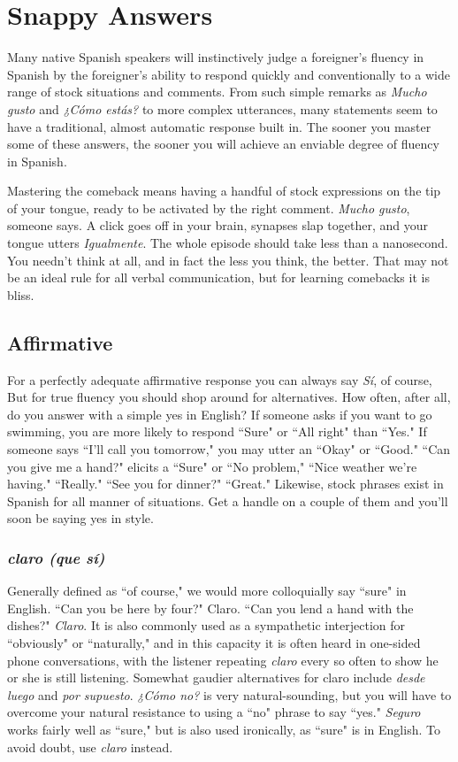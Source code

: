 \chapter{Snappy Answers}

Many native Spanish speakers will instinctively judge a foreigner's fluency in Spanish by the foreigner's ability to respond quickly
and conventionally to a wide range of stock situations and comments.
From such simple remarks as \emph{Mucho gusto} and \emph{¿Cómo estás?} to more
complex utterances, many statements seem to have a traditional, almost automatic response built in. The sooner you master some of
these answers, the sooner you will achieve an enviable degree of fluency in Spanish.

Mastering the comeback means having a handful of stock expressions on the tip of your tongue, ready to be activated by the right
comment. \emph{Mucho gusto}, someone says. A click goes off in your brain,
synapses slap together, and your tongue utters \emph{Igualmente}. The whole
episode should take less than a nanosecond. You needn't think at all,
and in fact the less you think, the better. That may not be an ideal rule
for all verbal communication, but for learning comebacks it is bliss.

\section{Affirmative}

For a perfectly adequate affirmative response you can always
say \emph{Sí}, of course, But for true fluency you should shop around for alternatives. How often, after all, do you answer with a simple yes in
English? If someone asks if you want to go swimming, you are more
likely to respond ``Sure" or ``All right" than ``Yes." If someone says ``I'll
call you tomorrow," you may utter an ``Okay" or ``Good." ``Can you
give me a hand?" elicits a ``Sure" or ``No problem," ``Nice weather
we're having." ``Really." ``See you for dinner?" ``Great." Likewise,
stock phrases exist in Spanish for all manner of situations. Get a
handle on a couple of them and you'll soon be saying yes in style.

\subsection{\emph{claro (que sí)}}

Generally defined as ``of course," we would more colloquially
say ``sure" in English. ``Can you be here by four?" Claro. ``Can you
lend a hand with the dishes?" \emph{Claro}. It is also commonly used as a
sympathetic interjection for ``obviously" or ``naturally," and in this capacity it is often heard in one-sided phone conversations, with the listener repeating \emph{claro} every so often to show he or she is still listening.
Somewhat gaudier alternatives for claro include \emph{desde luego} and \emph{por
supuesto}. \emph{¿Cómo no?} is very natural-sounding, but you will have to
overcome your natural resistance to using a ``no" phrase to say ``yes."
\emph{Seguro} works fairly well as ``sure," but is also used ironically, as ``sure"
is in English. To avoid doubt, use \emph{claro} instead.

